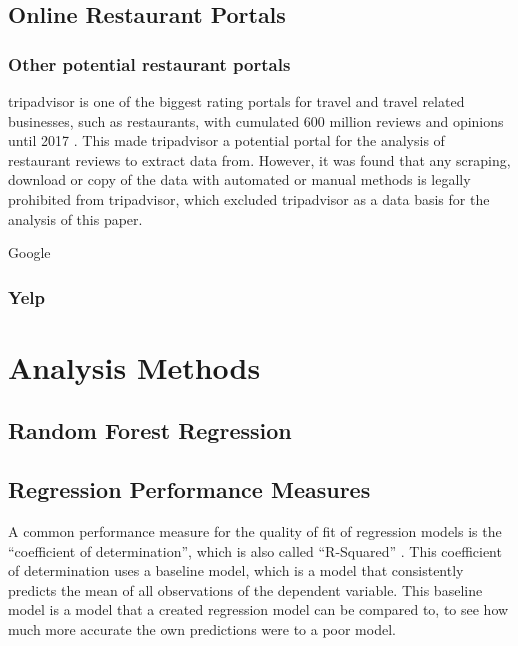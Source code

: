 \documentclass[a4paper, 11pt, oneside]{Thesis}  %
\begin{document}
\section{Online Restaurant Portals}

\subsection{Other potential restaurant portals}

tripadvisor is one of the biggest rating portals for travel and travel related businesses, such as restaurants, with cumulated 600 million reviews and opinions until 2017 \cite{StephenKaufer.27.04.2018}. This made tripadvisor a potential portal for the analysis of restaurant reviews to extract data from. However, it was found that any scraping, download or copy of the data with automated or manual methods is legally prohibited from tripadvisor, which excluded tripadvisor as a data basis for the analysis of this paper.

Google 



\subsection{Yelp}
 
 \chapter{Analysis Methods}

\section{Random Forest Regression}

\section{Regression Performance Measures}

A common performance measure for the quality of fit of regression models is the ``coefficient of determination'', which is also called ``R-Squared'' \cite{Devasthali.2018}. This coefficient of determination uses a baseline model, which is a model that consistently predicts the mean of all observations of the dependent variable. This baseline model is a model that a created regression model can be compared to, to see how much more accurate the own predictions were to a poor model.
\end{document}
